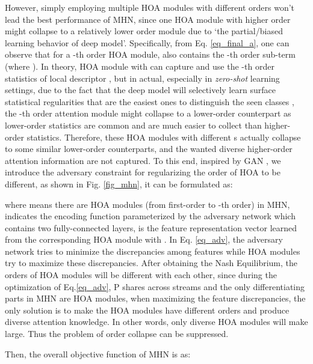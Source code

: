 \documentclass[10pt,twocolumn,letterpaper]{article}
\begin{document}
However, simply employing multiple HOA modules with different orders won't lead the best performance of MHN, since one HOA module with higher order might collapse to a relatively lower order module due to `the partial/biased learning behavior of deep model'. Specifically, from Eq. \ref{eq_final_a}, one can observe that for a -th order HOA module,  also contains the -th order sub-term (where ). In theory, HOA module with  can capture and use the -th order statistics of local descriptor , but in actual, especially in \emph{zero-shot} learning settings, due to the fact that the deep model will selectively learn surface statistical regularities that are the easiest ones to distinguish the seen classes \cite{chen2019energy}, the -th order attention module might collapse to a lower-order counterpart as lower-order statistics are common and are much easier to collect than higher-order statistics. Therefore, these HOA modules with different s actually collapse to some similar lower-order counterparts, and the wanted diverse higher-order attention information are not captured.
To this end, inspired by GAN \cite{goodfellow2014generative}, we introduce the adversary constraint for regularizing the order of HOA to be different, as shown in Fig. \ref{fig_mhn}, it can be formulated as:
\vspace{-0.8em}
\begin{small}

\end{small}
where  means there are  HOA modules (from first-order to -th order) in MHN,  indicates the encoding function parameterized by the adversary network which contains two fully-connected layers,  is the feature representation vector learned from the corresponding HOA module with . In Eq. \ref{eq_adv}, the adversary network  tries to minimize the discrepancies among features  while HOA modules try to maximize these discrepancies. After obtaining the Nash Equilibrium, the orders of HOA modules will be different with each other, since during the optimization of Eq.\ref{eq_adv}, P shares across streams and the only differentiating parts in MHN are HOA modules, when maximizing the feature discrepancies, the only solution is to make the HOA modules have different orders and produce diverse attention knowledge. In other words, only diverse HOA modules will make  large. Thus the problem of order collapse can be suppressed.

Then, the overall objective function of MHN is as:
\vspace{-0.5em}
\end{document}
